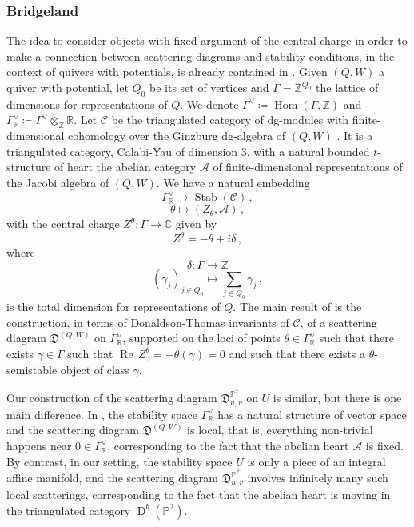 \documentclass[12pt, a4paper]{amsart}
\newcommand\C{\mathbb C}
\newcommand\PP{\mathbb P}
\newcommand\R{\mathbb R}
\newcommand\Z{\mathbb Z}
\newcommand\cA{\mathcal A}
\newcommand\cC{\mathcal C}
\newcommand\fD{\mathfrak D}
\newcommand\Hom{\operatorname{Hom}}
\newcommand\Rea{\operatorname{Re}\,}
\newcommand\Stab{\operatorname{Stab}}
\newcommand\D{\operatorname{D}}
\begin{document}
\subsubsection{Bridgeland}
The idea to consider objects with fixed argument of the central charge in order to make a connection between scattering diagrams
and stability conditions, in the context of quivers with potentials, is already contained in 
\cite{MR3710055}. Given $(Q,W)$ a quiver with potential, let $Q_0$ be its set of vertices and $\Gamma=\Z^{Q_0}$ the lattice of dimensions for representations of $Q$. We denote $\Gamma^\vee \coloneq \Hom(\Gamma,\Z)$ and $\Gamma^\vee_{\R}
\coloneq \Gamma^\vee \otimes_{\Z} \R$.
Let $\cC$ be the triangulated category of dg-modules with finite-dimensional cohomology
over the Ginzburg dg-algebra of $(Q,W)$ \cite{G06, KY11}.
It is a triangulated category, Calabi-Yau of dimension $3$, with a natural bounded $t$-structure of heart the abelian category 
$\cA$ of finite-dimensional representations of the Jacobi algebra of $(Q,W)$. 
We have a natural embedding 
\[ \Gamma_\R^\vee \rightarrow \Stab(\cC)\,,\]
\[ \theta \mapsto (Z_\theta, \cA) \,,\]
with the central charge $Z^\theta \colon \Gamma \rightarrow \C$ given by 
\[Z^\theta=-\theta+i \delta\,,\]
where 
\[\delta \colon \Gamma \rightarrow \Z\]
\[(\gamma_j)_{j\in Q_0} \mapsto \sum_{j \in Q_0} \gamma_j\,,\] 
is the 
total dimension for representations of $Q$.
The main result of \cite{MR3710055}
is the construction, in terms of Donaldson-Thomas invariants of 
$\cC$, of a scattering diagram $\fD^{(Q,W)}$ on 
$\Gamma_{\R}^\vee$, supported on the loci of points $\theta \in \Gamma_\R^\vee$ such that there exists
$\gamma \in \Gamma$ such that $\Rea Z^\theta_\gamma=-\theta(\gamma)=0$ and such that there exists a $\theta$-semistable object of class $\gamma$.

Our construction of the scattering diagram 
$\fD^{\PP^2}_{u,v}$ on $U$ is similar, but there is one main difference. 
In \cite{MR3710055}, the stability space $\Gamma_{\R}^\vee$ has a natural structure of vector space
and 
the scattering diagram $\fD^{(Q,W)}$ is local, that is, everything non-trivial happens near $0 \in \Gamma_\R^\vee$, corresponding to the fact that the abelian heart $\cA$ is fixed.
By contrast, in our setting, the stability space $U$ is only a piece of an integral affine manifold, and the scattering diagram
$\fD^{\PP^2}_{u,v}$ involves infinitely many such local scatterings, corresponding to the fact that the abelian heart is moving in the triangulated category 
$\D^b(\PP^2)$.
\end{document}

